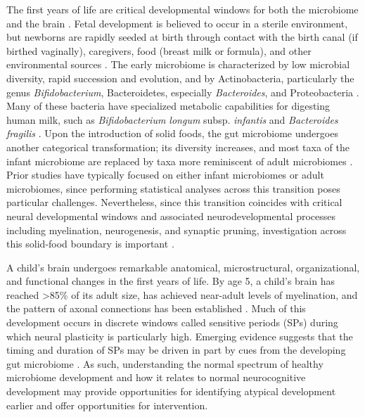 \documentclass{article}
\providecommand{\DIFadd}[1]{{\protect\color{blue}\uwave{#1}}} %
\providecommand{\DIFaddbegin}{} %
\providecommand{\DIFaddend}{} %
\newcommand{\DIFaddincludegraphics}[2][]{{\color{blue}\fbox{\DIFOincludegraphics[#1]{#2}}}} %
\DeclareRobustCommand{\DIFaddbegin}{\DIFOaddbegin \let\includegraphics\DIFaddincludegraphics} %
\DeclareRobustCommand{\DIFaddend}{\DIFOaddend \let\includegraphics\DIFOincludegraphics} %
\begin{document}
The first years of life are critical developmental windows for both the
microbiome and the brain
\cite{laueDevelopingMicrobiomeBirth2022}.
Fetal development is believed to occur in a sterile environment, but newborns
are rapidly seeded at birth through contact with the birth canal (if
birthed vaginally), caregivers, food (breast milk or formula),
and other environmental sources
\cite{backhedDynamicsStabilizationHuman2015,bokulichAntibioticsBirthMode2016}.
The early microbiome is characterized by low microbial
diversity, rapid succession and evolution, and  \DIFaddbegin \DIFadd{is dominated }\DIFaddend by
Actinobacteria, particularly the genus \emph{Bifidobacterium},
Bacteroidetes, especially \emph{Bacteroides}, and Proteobacteria
\cite{koenigSuccessionMicrobialConsortia2011}.
Many of these bacteria have specialized metabolic capabilities
for digesting human  milk, such as \emph{Bifidobacterium longum}
subsp. \textit{infantis} and \emph{Bacteroides fragilis}
\cite{selaGenomeSequenceBifidobacterium2008}.
Upon the introduction of solid foods, the gut
microbiome undergoes another categorical transformation;
its diversity increases, and most taxa of the infant microbiome
are replaced by taxa more reminiscent of adult microbiomes
\cite{backhedDynamicsStabilizationHuman2015}.
Prior studies have typically focused on either infant microbiomes or
adult microbiomes, since performing statistical analyses across this
transition poses particular challenges. Nevertheless, since this
transition coincides with critical neural developmental windows and
associated neurodevelopmental processes including myelination, neurogenesis, and synaptic pruning,
investigation across this solid-food boundary is important
\cite{tauNormalDevelopmentBrain2010}.

A child's brain undergoes remarkable anatomical, microstructural,
organizational, and functional changes in the first years of life. By
age 5, a child's brain has reached \textgreater85\% of its adult size,
has achieved near-adult levels of myelination, and the pattern of axonal
connections has been established
\cite{silbereisCellularMolecularLandscapes2016}.
Much of this development occurs in discrete windows called
sensitive periods (SPs)
\cite{knudsenSensitivePeriodsDevelopment2004}
during which neural plasticity is particularly high.
Emerging evidence suggests that the timing and duration of SPs
may be driven in part by cues from the developing gut microbiome
\cite{callaghanNestedSensitivePeriods2020,cowanAnnualResearchReview2020}.
As such, understanding the normal spectrum of healthy microbiome
development and how it relates to normal neurocognitive development may
provide opportunities for identifying atypical development earlier and
offer opportunities for intervention.
\end{document}
